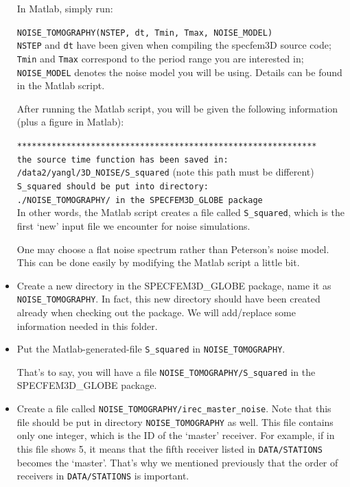 \documentclass[oneside,english]{book}
\begin{document}
\begin{itemize}
In Matlab, simply run:

\texttt{NOISE\_TOMOGRAPHY(NSTEP, dt, Tmin, Tmax, NOISE\_MODEL)}\\

\texttt{NSTEP} and \texttt{dt} have been given when compiling the specfem3D source code;
\texttt{Tmin} and \texttt{Tmax} correspond to the period range you are interested in;
\texttt{NOISE\_MODEL} denotes the noise model you will be using.
Details can be found in the Matlab script.

After running the Matlab script, you will be given the following information (plus a figure in Matlab):

\texttt{*************************************************************}\\
\texttt{the source time function has been saved in:}\\
\texttt{/data2/yangl/3D\_NOISE/S\_squared} (note this path must be different)\\
\texttt{S\_squared should be put into directory:}\\
\texttt{./NOISE\_TOMOGRAPHY/ in the SPECFEM3D\_GLOBE package}\\

In other words, the Matlab script creates a file called \texttt{S\_squared},
which is the first `new' input file we encounter for noise simulations.

One may choose a flat noise spectrum rather than Peterson's noise model.
This can be done easily by modifying the Matlab script a little bit.

\item
Create a new directory in the SPECFEM3D\_GLOBE package, name it as \texttt{NOISE\_TOMOGRAPHY}.
In fact, this new directory should have been created already when checking out the package.
We will add/replace some information needed in this folder.

\item
Put the Matlab-generated-file \texttt{S\_squared} in \texttt{NOISE\_TOMOGRAPHY}.

That's to say, you will have a file \texttt{NOISE\_TOMOGRAPHY/S\_squared} in the SPECFEM3D\_GLOBE package.

\item
Create a file called \texttt{NOISE\_TOMOGRAPHY/irec\_master\_noise}. Note that this file should be put
in directory \texttt{NOISE\_TOMOGRAPHY} as well. This file contains only one integer, which is the ID
of the `master' receiver. For example, if in this file shows 5, it means that the fifth receiver
listed in \texttt{DATA/STATIONS} becomes the `master'. That's why we mentioned previously that
the order of receivers in \texttt{DATA/STATIONS} is important.


\end{itemize}
\end{document}
